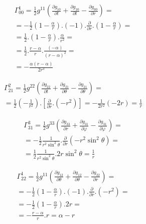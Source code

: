 \documentclass[a4paper,12pt]{article}
\begin{document}
    \begin{equation}
        \begin{aligned}
        \varGamma^1_{00} = \frac{1}{2}g^{11}\left(\frac{\partial g_{10}}{\partial t} + \frac{\partial g_{10}}{\partial t} - \frac{\partial g_{00}}{\partial r}\right) =\\
        = -\frac{1}{2}\left( 1- \frac{\alpha}{r}\right).(-1).\frac{\partial}{\partial r}.\left( 1- \frac{\alpha}{r}\right) =\\
        = \frac{1}{2}.\left( 1- \frac{\alpha}{r}\right).\frac{\alpha}{r^2} =\\ 
        = \frac{1}{2}.\frac{r-\alpha}{r}.\frac{(-\alpha)}{(r-\alpha)^2} = \\
        = -\frac{\alpha(r-\alpha)}{2r^3}
        \end{aligned}
    \end{equation}
    \newline

    \begin{equation}
        \begin{aligned}
        \varGamma^2_{21} = \frac{1}{2}g^{22}\left(\frac{\partial g_{22}}{\partial t} + \frac{\partial g_{21}}{\partial \theta} - \frac{\partial g_{21}}{\partial \theta}\right) =\\
        = \frac{1}{2}\left(- \frac{1}{r^2}\right).\left[\frac{\partial}{\partial r}.(-r^2)\right] = - \frac{1}{2r^2}(-2r) = \frac{1}{r}
        \end{aligned}
    \end{equation}
    \newline

    \begin{equation}
        \begin{aligned}
        \varGamma^3_{31} = \frac{1}{2}g^{33}\left(\frac{\partial g_{33}}{\partial r} + \frac{\partial g_{31}}{\partial \varphi} - \frac{\partial g_{31}}{\partial \varphi}\right) =\\
        = -\frac{1}{2}\frac{1}{r^2\sin^2\theta}.\frac{\partial}{\partial r}(-r^2\sin^2\theta) = \\
        = \frac{1}{2} \frac{1}{r^2\sin^2\theta}.2r\sin^2\theta = \frac{1}{r}
        \end{aligned}
    \end{equation}
    \newline

    \begin{equation}
        \begin{aligned}
        \varGamma^1_{22} = \frac{1}{2}g^{11}\left(\frac{\partial g_{12}}{\partial \theta} + \frac{\partial g_{12}}{\partial \theta} - \frac{\partial g_{22}}{\partial r}\right) =\\
        = -\frac{1}{2}\left(1- \frac{\alpha}{r}\right).(-1).\frac{\partial}{\partial r}.(-r^2) = \\
        = -\frac{1}{2} \left(1-\frac{\alpha}{r}\right).2r = \\
        = - \frac{r-\alpha}{r}.r = \alpha - r
        \end{aligned}
    \end{equation}
    \newline
\end{document}
